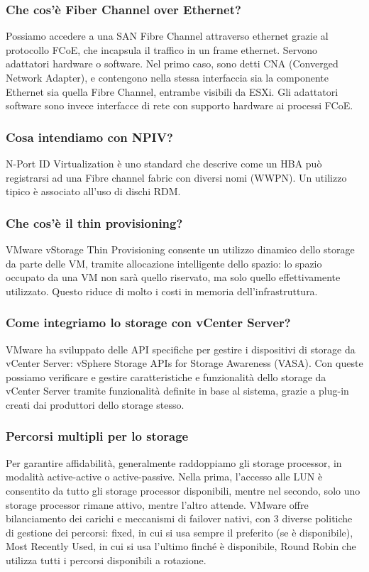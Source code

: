 \documentclass[11pt]{article}
\begin{document}
\subsubsection{Che cos'è Fiber Channel over Ethernet?}
Possiamo accedere a una SAN Fibre Channel attraverso ethernet grazie al protocollo FCoE, che incapsula il traffico in un frame ethernet. Servono adattatori hardware o software. Nel primo caso, sono detti CNA (Converged Network Adapter), e contengono nella stessa interfaccia sia la componente Ethernet sia quella Fibre Channel, entrambe visibili da ESXi. Gli adattatori software sono invece interfacce di rete con supporto hardware ai processi FCoE. 

\subsubsection{Cosa intendiamo con NPIV?}
N-Port ID Virtualization è uno standard che descrive come un HBA può registrarsi ad una Fibre channel fabric con diversi nomi (WWPN). Un utilizzo tipico è associato all'uso di dischi RDM.

\subsubsection{Che cos'è il thin provisioning?}
VMware vStorage Thin Provisioning consente un utilizzo dinamico dello storage da parte delle VM, tramite allocazione intelligente dello spazio: lo spazio occupato da una VM non sarà quello riservato, ma solo quello effettivamente utilizzato. Questo riduce di molto i costi in memoria dell'infrastruttura. 

\subsubsection{Come integriamo lo storage con vCenter Server?}
VMware ha sviluppato delle API specifiche per gestire i dispositivi di storage da vCenter Server: vSphere Storage APIs for Storage Awareness (VASA). Con queste possiamo verificare e gestire caratteristiche e funzionalità dello storage da vCenter Server tramite funzionalità definite in base al sistema, grazie a plug-in creati dai produttori dello storage stesso. 

\subsubsection{Percorsi multipli per lo storage}
Per garantire affidabilità, generalmente raddoppiamo gli storage processor, in modalità active-active o active-passive. Nella prima, l'accesso alle LUN è consentito da tutto gli storage processor disponibili, mentre nel secondo, solo uno storage processor rimane attivo, mentre l'altro attende. VMware offre bilanciamento dei carichi e meccanismi di failover nativi, con 3 diverse politiche di gestione dei percorsi: fixed, in cui si usa sempre il preferito (se è disponibile), Most Recently Used, in cui si usa l'ultimo finché è disponibile, Round Robin che utilizza tutti i percorsi disponibili a rotazione.
\end{document}
